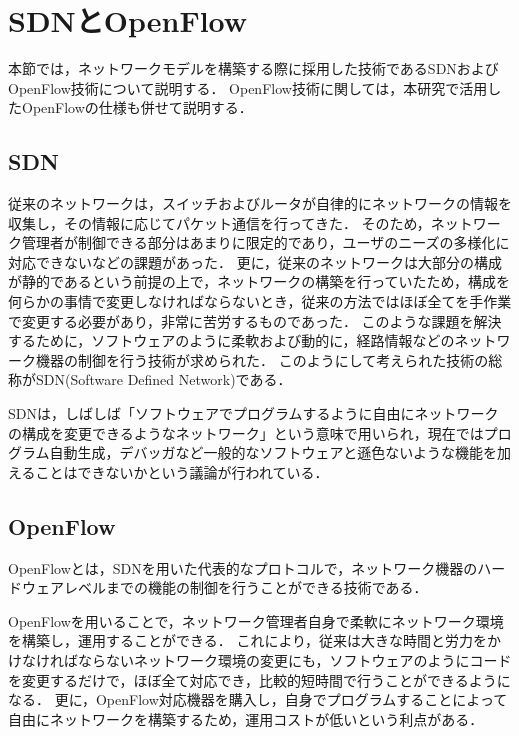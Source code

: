 \section{SDNとOpenFlow}

本節では，ネットワークモデルを構築する際に採用した技術であるSDNおよびOpenFlow技術について説明する．
OpenFlow技術に関しては，本研究で活用したOpenFlowの仕様も併せて説明する．

\subsection{SDN}

従来のネットワークは，スイッチおよびルータが自律的にネットワークの情報を収集し，その情報に応じてパケット通信を行ってきた\cite{openflownet}．
そのため，ネットワーク管理者が制御できる部分はあまりに限定的であり，ユーザのニーズの多様化に対応できないなどの課題があった．
更に，従来のネットワークは大部分の構成が静的であるという前提の上で，ネットワークの構築を行っていたため，構成を何らかの事情で変更しなければならないとき，従来の方法ではほぼ全てを手作業で変更する必要があり，非常に苦労するものであった．
このような課題を解決するために，ソフトウェアのように柔軟および動的に，経路情報などのネットワーク機器の制御を行う技術が求められた．
このようにして考えられた技術の総称がSDN(Software Defined Network)である．

SDNは，しばしば「ソフトウェアでプログラムするように自由にネットワークの構成を変更できるようなネットワーク」という意味で用いられ\cite{openflowjapanese}，現在ではプログラム自動生成，デバッガなど一般的なソフトウェアと遜色ないような機能を加えることはできないかという議論が行われている．

\subsection{OpenFlow}

OpenFlowとは，SDNを用いた代表的なプロトコルで，ネットワーク機器のハードウェアレベルまでの機能の制御を行うことができる技術である\cite{openflowjapanese}．

OpenFlowを用いることで，ネットワーク管理者自身で柔軟にネットワーク環境を構築し，運用することができる．
これにより，従来は大きな時間と労力をかけなければならないネットワーク環境の変更にも，ソフトウェアのようにコードを変更するだけで，ほぼ全て対応でき，比較的短時間で行うことができるようになる．
更に，OpenFlow対応機器を購入し，自身でプログラムすることによって自由にネットワークを構築するため，運用コストが低いという利点がある．

